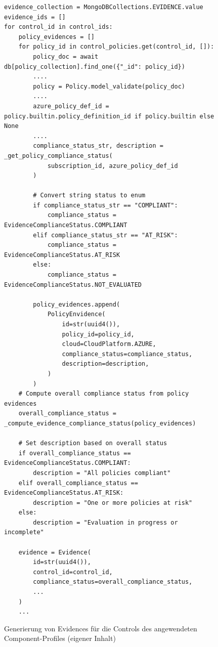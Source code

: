 \begin{figure}[H]
\centering
\begin{verbatim}
evidence_collection = MongoDBCollections.EVIDENCE.value
evidence_ids = []
for control_id in control_ids:
    policy_evidences = []
    for policy_id in control_policies.get(control_id, []):
        policy_doc = await db[policy_collection].find_one({"_id": policy_id})
        ....
        policy = Policy.model_validate(policy_doc)
        ....
        azure_policy_def_id = policy.builtin.policy_definition_id if policy.builtin else None
        ....
        compliance_status_str, description = _get_policy_compliance_status(
            subscription_id, azure_policy_def_id
        )
        
        # Convert string status to enum
        if compliance_status_str == "COMPLIANT":
            compliance_status = EvidenceComplianceStatus.COMPLIANT
        elif compliance_status_str == "AT_RISK":
            compliance_status = EvidenceComplianceStatus.AT_RISK
        else:
            compliance_status = EvidenceComplianceStatus.NOT_EVALUATED
        
        policy_evidences.append(
            PolicyEnvidence(
                id=str(uuid4()),
                policy_id=policy_id,
                cloud=CloudPlatform.AZURE,
                compliance_status=compliance_status,
                description=description,
            )
        )
    # Compute overall compliance status from policy evidences
    overall_compliance_status = _compute_evidence_compliance_status(policy_evidences)
    
    # Set description based on overall status
    if overall_compliance_status == EvidenceComplianceStatus.COMPLIANT:
        description = "All policies compliant"
    elif overall_compliance_status == EvidenceComplianceStatus.AT_RISK:
        description = "One or more policies at risk"
    else:
        description = "Evaluation in progress or incomplete"
    
    evidence = Evidence(
        id=str(uuid4()),
        control_id=control_id,
        compliance_status=overall_compliance_status,
        ...
    )
    ...
\end{verbatim}
\caption{Generierung von Evidences für die Controls des angewendeten Component-Profiles (eigener Inhalt)}
\label{fig:evidence-generation-flow}
\end{figure}

